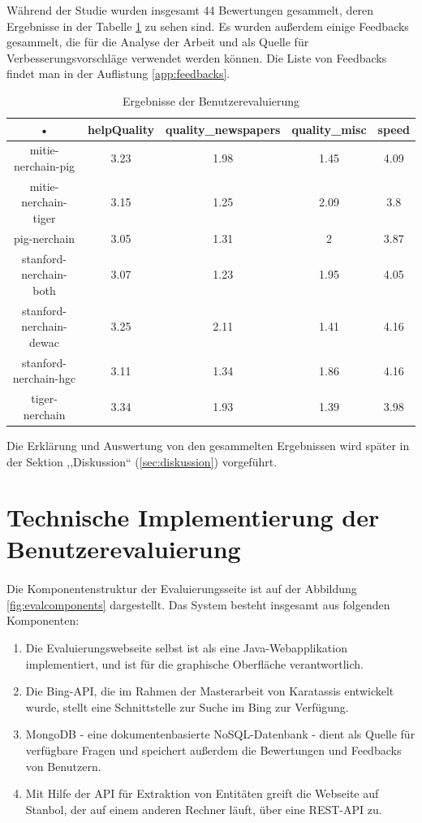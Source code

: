 Während der Studie wurden insgesamt 44 Bewertungen gesammelt, deren Ergebnisse in der Tabelle \ref{app:RESULTS} zu sehen sind. Es wurden außerdem einige Feedbacks gesammelt, die für die Analyse der Arbeit und als Quelle für Verbesserungsvorschläge verwendet werden können. Die Liste von Feedbacks findet man in der Auflistung \ref{app:feedbacks}.

\begin{table}
\begin{tabular}{|c|c|c|c|c|}
\hline 
• & helpQuality & quality\_newspapers & quality\_misc & speed \\ 
\hline 
mitie-nerchain-pig & 3.23 & 1.98 & 1.45 & 4.09 \\ 
\hline 
mitie-nerchain-tiger & 3.15 & 1.25 & 2.09 & 3.8 \\ 
\hline 
pig-nerchain & 3.05 & 1.31 & 2 & 3.87 \\ 
\hline 
stanford-nerchain-both & 3.07 & 1.23 & 1.95 & 4.05 \\ 
\hline 
stanford-nerchain-dewac & 3.25 & 2.11 & 1.41 & 4.16 \\ 
\hline 
stanford-nerchain-hgc & 3.11 & 1.34 & 1.86 & 4.16 \\ 
\hline 
tiger-nerchain & 3.34 & 1.93 & 1.39 & 3.98 \\ 
\hline 
\end{tabular} 
\caption{Ergebnisse der Benutzerevaluierung}
\label{app:RESULTS}
\end{table}

Die Erklärung und Auswertung von den gesammelten Ergebnissen wird später in der Sektion ,,Diskussion`` (\ref{sec:diskussion}) vorgeführt. 

\section{Technische Implementierung der Benutzerevaluierung}
\paragraph{}
Die Komponentenstruktur der Evaluierungsseite ist auf der Abbildung \ref{fig:evalcomponents} dargestellt. Das System besteht insgesamt aus folgenden Komponenten:
\begin{enumerate}
\item Die Evaluierungswebseite selbst ist als eine Java-Webapplikation implementiert, und ist für die graphische Oberfläche verantwortlich.
\item Die Bing-API, die im Rahmen der Masterarbeit von Karatassis\cite{Karatassis:15} entwickelt wurde, stellt eine Schnittstelle zur Suche im Bing zur Verfügung.
\item MongoDB - eine dokumentenbasierte NoSQL-Datenbank - dient als Quelle für verfügbare Fragen und speichert außerdem die Bewertungen und Feedbacks von Benutzern.
\item Mit Hilfe der API für Extraktion von Entitäten greift die Webseite auf Stanbol, der auf einem anderen Rechner läuft, über eine REST-API zu. 
\end{enumerate}

